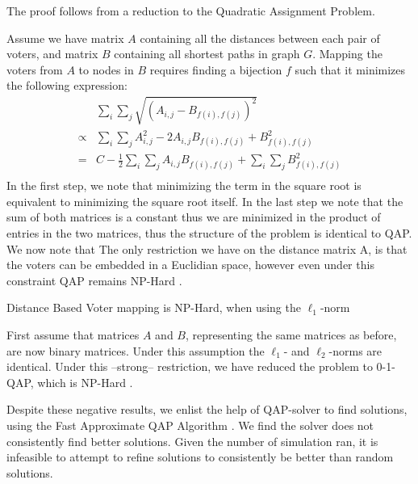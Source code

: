 \begin{proofc}{}
	The proof follows from a reduction to the Quadratic Assignment Problem.

	Assume we have matrix $A$ containing all the distances between each pair of voters, and matrix $B$ containing all shortest paths in graph $G$. Mapping the voters from $A$ to nodes in $B$ requires finding a bijection $f$ such that it minimizes the following expression:
	$$
		\begin{aligned}
			        & \sum_{i} \sum_{j} \sqrt{\left(A_{i,j} -B_{f(i),f(j)}\right)^2}                              \\
			\propto & \sum_{i} \sum_{j} A_{i,j}^2 -2A_{i,j}B_{f(i),f(j)} + B_{f(i),f(j)}^2                        \\
			=       & C - \frac{1}{2} \sum_{i} \sum_{j} A_{i,j}B_{f(i),f(j)} + \sum_{i} \sum_{j}  B_{f(i),f(j)}^2 \\
		\end{aligned}
	$$
	In the first step, we note that minimizing the term in the square root is
	equivalent to minimizing the square root itself. In the last step we note that
	the sum of both matrices is a constant thus we are minimized in the product of entries
	in the two matrices, thus the structure of the problem is identical to QAP. We
	now note that The only restriction we have on the distance matrix A, is that
	the voters can be embedded in a Euclidian space, however even under this
	constraint QAP remains NP-Hard \cite{queyrannePerformanceRatioPolynomial1986}.
\end{proofc}

\begin{corollary}{}
	Distance Based Voter mapping is NP-Hard, when using the $\ell_1$-norm
\end{corollary}

\begin{proofc}{}
	First assume that matrices $A$ and $B$, representing the same matrices as before, are now binary matrices. Under this assumption the $\ell_1$- and $\ell_2$-norms are identical. Under this --strong-- restriction, we have reduced the problem to 0-1-QAP, which is NP-Hard \cite{nagarajanMaximumQuadraticAssignment}.
\end{proofc}

Despite these negative results, we enlist the help of QAP-solver
\cite{virtanenSciPy10Fundamental2020}  to find solutions, using the Fast
Approximate QAP Algorithm \cite{vogelsteinFastApproximateQuadratic2015}. We
find the solver does not consistently find better solutions. Given the number
of simulation ran, it is infeasible to attempt to refine solutions to
consistently be better than random solutions.


